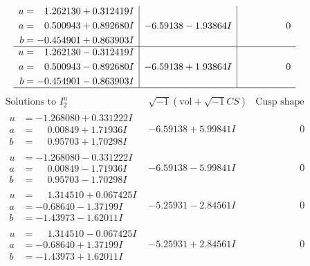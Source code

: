 \documentclass[1p]{elsarticle_modified}
\theoremstyle{definition}
\newcommand{\I}{\sqrt{-1}}
\begin{document}
$$\begin{array}{c|c|c}
\begin{aligned}
u &= \phantom{-}1.262130 + 0.312419 I \\
a &= \phantom{-}0.500943 + 0.892680 I \\
b &= -0.454901 + 0.863903 I\end{aligned}
 & -6.59138 - 1.93864 I & \phantom{-0.000000 } 0 \\ \hline\begin{aligned}
u &= \phantom{-}1.262130 - 0.312419 I \\
a &= \phantom{-}0.500943 - 0.892680 I \\
b &= -0.454901 - 0.863903 I\end{aligned}
 & -6.59138 + 1.93864 I & \phantom{-0.000000 } 0\\
 \hline 
 \end{array}$$\newpage$$\begin{array}{c|c|c}  
\text{Solutions to }I^u_{2}& \I (\text{vol} + \sqrt{-1}CS) & \text{Cusp shape}\\
 \hline 
\begin{aligned}
u &= -1.268080 + 0.331222 I \\
a &= \phantom{-}0.00849 + 1.71936 I \\
b &= \phantom{-}0.95703 + 1.70298 I\end{aligned}
 & -6.59138 + 5.99841 I & \phantom{-0.000000 } 0 \\ \hline\begin{aligned}
u &= -1.268080 - 0.331222 I \\
a &= \phantom{-}0.00849 - 1.71936 I \\
b &= \phantom{-}0.95703 - 1.70298 I\end{aligned}
 & -6.59138 - 5.99841 I & \phantom{-0.000000 } 0 \\ \hline\begin{aligned}
u &= \phantom{-}1.314510 + 0.067425 I \\
a &= -0.68640 - 1.37199 I \\
b &= -1.43973 - 1.62011 I\end{aligned}
 & -5.25931 - 2.84561 I & \phantom{-0.000000 } 0 \\ \hline\begin{aligned}
u &= \phantom{-}1.314510 - 0.067425 I \\
a &= -0.68640 + 1.37199 I \\
b &= -1.43973 + 1.62011 I\end{aligned}
 & -5.25931 + 2.84561 I & \phantom{-0.000000 } 0 \\ \hline\begin{aligned}

\end{aligned}
\end{array}$$
\end{document}
